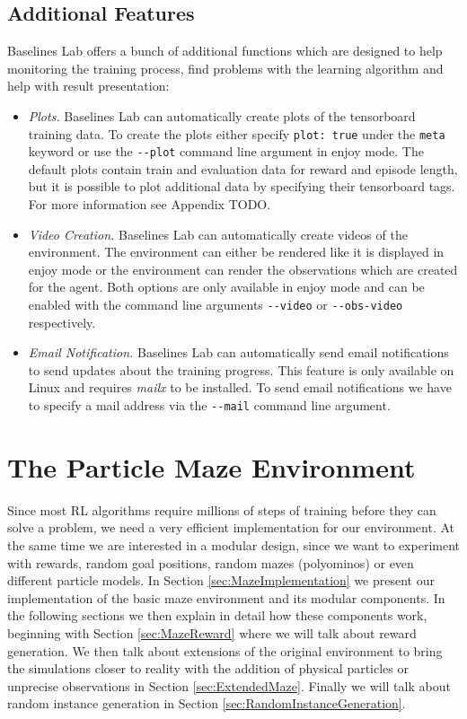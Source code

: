 \subsection{Additional Features} \label{sec:blAdvanced}
Baselines Lab offers a bunch of additional functions which are designed to help monitoring the training process, find problems with the learning algorithm and help with result presentation:

\begin{itemize}
    \item \textit{Plots.} Baselines Lab can automatically create plots of the tensorboard training data. To create the plots either specify \texttt{plot: true} under the \texttt{meta} keyword or use the \texttt{-{}-plot} command line argument in enjoy mode. The default plots contain train and evaluation data for reward and episode length, but it is possible to plot additional data by specifying their tensorboard tags. For more information see Appendix TODO.
    \item \textit{Video Creation.} Baselines Lab can automatically create videos of  the environment. The environment can either be rendered like it is displayed in enjoy mode or the environment can render the observations which are created for the agent. Both options are only available in enjoy mode and can be enabled with the command line arguments \texttt{-{}-video} or \texttt{-{}-obs-video} respectively.
    \item \textit{Email Notification.} Baselines Lab can automatically send email notifications to send updates about the training progress. This feature is only available on Linux and requires \textit{mailx} to be installed. To send email notifications we have to specify a mail address via the \texttt{-{}-mail} command line argument. 
\end{itemize}

\section{The Particle Maze Environment} \label{sec:MazeEnvironment}
Since most RL algorithms require millions of steps of training before they can solve a problem, we need a very efficient implementation for our environment. At the same time we are interested in a modular design, since we want to experiment with rewards, random goal positions, random mazes (polyominos) or even different particle models. In Section \ref{sec:MazeImplementation} we present our implementation of the basic maze environment and its modular components. In the following sections we then explain in detail how these components work, beginning with Section \ref{sec:MazeReward} where we will talk about reward generation. We then talk about extensions of the original environment to bring the simulations closer to reality with the addition of physical particles or unprecise observations in Section \ref{sec:ExtendedMaze}. Finally we will talk about random instance generation in Section \ref{sec:RandomInstanceGeneration}.

